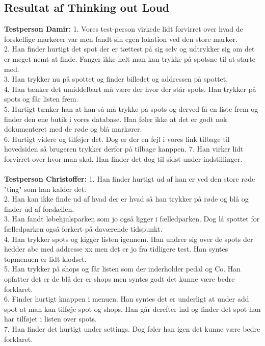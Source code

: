 \documentclass[12pt]{article}
\begin{document}
\subsection*{Resultat af Thinking out Loud}
\textbf{Testperson Damir:}
1. Vores test-person virkede lidt forvirret over hvad de forskellige markører var men fandt sin egen lokation ved den store markør.\\
2. Han finder hurtigt det spot der er tættest på sig selv og udtrykker sig om det er meget nemt at finde. Fanger ikke helt man kan trykke på spotsne til at starte med.\\
3. Han trykker nu på spottet og finder billedet og addressen på spottet.\\
4. Han tænker det umiddelbart må være der hvor der står spots. Han trykker på spots og får listen frem.\\
5. Hurtigt tænker han at han så må trykke på spots og derved få en liste frem og finder den ene butik i vores database. Han føler ikke at det er godt nok dokumenteret med de røde og blå markører.\\
6. Hurtigt videre og tilføjer det. Dog er der en fejl i vores link tilbage til hovedsiden så brugeren trykker derfor på tilbage kanppen.
7. Han virker lidt forvirret over hvor man skal. Han finder det dog til sidst under indstillinger.\\  \\
\textbf{Testperson Christoffer:}
1. Han finder hurtigt ud af han er ved den store røde "ting" som han kalder det.\\
2. Han kan ikke finde ud af hvad der er hvad så han trykker på røde og blå og finder ud af forskellen.\\
3. Han fandt løbehjulsparken som jo også ligger i fælledparken. Dog lå spottet for fælledparken også forkert på daværende tidspunkt.\\
4. Han trykker spots og kigger listen igennem. Han undrer sig over de spots der hedder abc med addresse xx men det er jo fra tidligere test. Han syntes topmenuen er lidt klodset.\\
5. Han trykker på shops og får listen som der inderholder pedal og Co. Han opfatter det er de blå der er shops men syntes godt det kunne være bedre forklaret.\\
6. Finder hurtigt knappen i menuen. Han syntes det er underligt at under add spot at man kan tilføje spot og shops. Han går derefter ind og finder det spot han har tilføjet i listen over spots.\\
7. Han finder det hurtigt under settings. Dog føler han igen det kunne være bedre forklaret.
\pagebreak
\end{document}
